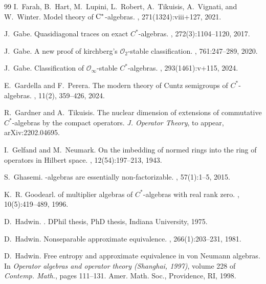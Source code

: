 \documentclass[reqno]{amsart}
\theoremstyle{definition}
\theoremstyle{remark}
\numberwithin{equation}{section}
\theoremstyle{definition}
\begin{document}
\begin{thebibliography}{99}
I.~Farah, B.~Hart, M.~Lupini, L.~Robert, A.~Tikuisis, A.~Vignati, and
  W.~Winter.
\newblock Model theory of {$\rm C^*$}-algebras.
, 271(1324):viii+127, 2021.

J.~Gabe.
\newblock Quasidiagonal traces on exact {$C^*$}-algebras.
, 272(3):1104--1120, 2017.

J.~Gabe.
\newblock A new proof of kirchberg's {$\mathcal{O}_2$}-stable classification.
, 761:247--289, 2020.

J.~Gabe.
\newblock Classification of {$\mathcal{O}_\infty$}-stable {$C^*$}-algebras.
, 293(1461):v+115, 2024.

E.~Gardella and F.~Perera.
\newblock The modern theory of {C}untz semigroups of {$C^*$}-algebras.
, 11(2), 359–426, 2024. 

R.~Gardner and A.~Tikuisis.
\newblock The nuclear dimension of extensions of commutative {$C^*$}-algebras
  by the compact operators.
\newblock \emph{J. Operator Theory}, to appear, arXiv:2202.04695.

I.~Gelfand and M.~Neumark.
\newblock On the imbedding of normed rings into the ring of operators in
  {H}ilbert space.
, 12(54):197--213, 1943.

S.~Ghasemi.
-algebras are essentially non-factorizable.
, 57(1):1--5, 2015.

K.~R. Goodearl.
 of multiplier algebras of {$C^\ast$}-algebras with real rank
  zero.
, 10(5):419--489, 1996.

D.~Hadwin.
.
\newblock DPhil thesis, PhD thesis, Indiana University, 1975.

D.~Hadwin.
\newblock Nonseparable approximate equivalence.
, 266(1):203--231, 1981.

D.~Hadwin.
\newblock Free entropy and approximate equivalence in von {N}eumann algebras.
\newblock In {\em Operator algebras and operator theory ({S}hanghai, 1997)},
  volume 228 of {\em Contemp. Math.}, pages 111--131. Amer. Math. Soc.,
  Providence, RI, 1998.


\end{thebibliography}
\end{document}
